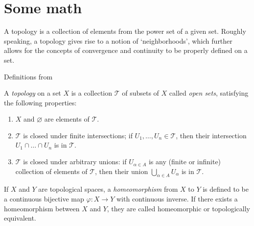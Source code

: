 %
\chapter{Some math}
A topology is a collection of elements from the power set of a given set. Roughly speaking, a topology gives rise to a notion of `neighborhoods', which further allows for the concepts of convergence and continuity to be properly defined on a set.

Definitions from \cite{Lee2000}

\begin{definition}[Topology]
    A \emph{topology} on a set $X$ is a collection $\mathscr{T}$ of subsets of $X$ called \emph{open sets}, satisfying the following properties:
    \begin{enumerate}[label=\roman*]
        \item $X$ and $\varnothing$ are elements of $\mathscr{T}$.
        \item $\mathscr{T}$ is closed under finite intersections; if $U_1,\ldots,U_n \in \mathscr{T}$, then their intersection $U_1 \cap \ldots \cap U_n$ is in $\mathscr{T}$.
            \item $\mathscr{T}$ is closed under arbitrary unions: if $U_{\alpha \in A}$ is any (finite or infinite) collection of elements of $\mathscr{T}$, then their union $\displaystyle\bigcup_{\alpha \in A}  U_\alpha$ is in $\mathscr{T}$.
    \end{enumerate}
\end{definition}
\begin{definition}[Homeomorphism]
    If $X$ and $Y$ are topological spaces, a \emph{homeomorphism} from $X$ to $Y$ is defined to be a continuous bijective map $\varphi: X\to Y$ with continuous inverse. If there exists a homeomorphism between $X$ and $Y$, they are called homeomorphic or topologically equivalent.
\end{definition}
